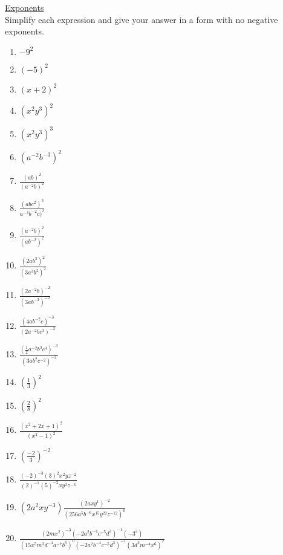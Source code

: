 \documentclass{article}
\begin{document}
\newpage
\underline{Exponents}\\
Simplify each expression and give your answer in a form with no negative exponents.
\begin{enumerate}
\item $-9^{2}$
\item $(-5)^{2}$
\item $(x+2)^{2}$
\item $(x^{2}y^{3})^{2}$
\item $(x^{2}y^{3})^{3}$
\item $(a^{-2}b^{-3})^{2}$
\item {\Large $\frac{(ab)^{2}}{(a^{-2}b)^{2}}$}
\item {\Large $\frac{(abc^{2})^{3}}{a^{-3}b^{-2}c)^{2}}$}
\item {\Large $\frac{(a^{-2}b)^{2}}{(ab^{-2})^{2}}$}
\item {\Large $\frac{(2ab^{3})^{2}}{(3a^{3}b^{2})^{2}}$}
\item {\Large $\frac{(2a^{-2}b)^{-2}}{(3ab^{-3})^{-2}}$}
\item {\Large $\frac{(4ab^{-2}c)^{-3}}{(2a^{-2}bc^{3})^{-2}}$}
\item {\Large $\frac{(\frac{1}{2}a^{-2}b^{3}c^{4})^{-3}}{(3ab^{2}c^{-2})^{-2}}$}
\item {\Large $(\frac{1}{3})^{2}$}
\item {\Large $(\frac{2}{8})^{2}$}
\item {\Large $\frac{(x^{2}+2x+1)^{2}}{(x^{2}-1)^{2}}$}
\item {\Large $(\frac{-2}{3})^{-2}$}
\item {\Large $\frac{(-2)^{-3}(3)^{2}x^{2}yz^{-2}}{(2)^{-1}(5)^{-2}xy^{2}z^{-3}}$}
\item {\Large $(2a^{2}xy^{-3})\frac{(2axy^{1})^{-2}}{(256a^{5}b^{-6}x^{15}y^{22}z^{-12})^{0}}$}
\item {\Large $\frac{(2mx^{2})^{-3}(-2a^{2}b^{-4}c^{-5}d^{3})^{-1}(-3^{3})}{(15x^{5}m^{3}d^{-4}a^{-7}b^{6})^{0}(-2a^{2}b^{-4}c^{-5}d^{3})^{-1}(3d^{2}m^{-4}x^{6})^{2}}$}
\end{enumerate}
\end{document}
